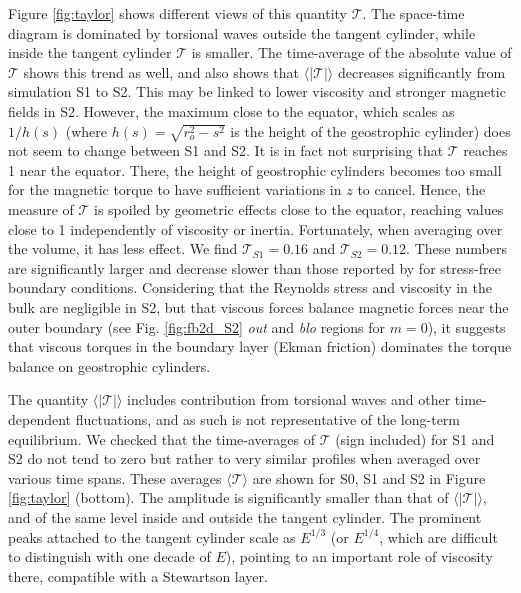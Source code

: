 \documentclass[12pt, a4paper]{article}
\begin{document}
Figure \ref{fig:taylor} shows different views of this quantity $\mathcal{T}$.
The space-time diagram is dominated by torsional waves outside the tangent cylinder, while inside the tangent cylinder $\mathcal{T}$ is smaller.
The time-average of the absolute value of $\mathcal{T}$ shows this trend as well, and also shows that $\langle|\mathcal{T}|\rangle$ decreases significantly from simulation S1 to S2.
This may be linked to lower viscosity and stronger magnetic fields in S2.
However, the maximum close to the equator, which scales as $1/h(s)$ (where $h(s) = \sqrt{r_o^2 - s^2}$ is the height of the geostrophic cylinder) does not seem to change between S1 and S2.
It is in fact not surprising that $\mathcal{T}$ reaches 1 near the equator.
There, the height of geostrophic cylinders becomes too small for the magnetic torque to have sufficient variations in $z$ to cancel.
Hence, the measure of $\mathcal{T}$ is spoiled by geometric effects close to the equator, reaching values close to 1 independently of viscosity or inertia.
Fortunately, when averaging over the volume, it has less effect.
We find $\mathcal{T}_{S1}=0.16$ and $\mathcal{T}_{S2}=0.12$.
These numbers are significantly larger and decrease slower than those reported by \cite{aubert2017} for stress-free boundary conditions.
Considering that the Reynolds stress and viscosity in the bulk are negligible in S2, but that viscous forces balance magnetic forces near the outer boundary (see Fig. \ref{fig:fb2d_S2} \textit{out} and \textit{blo} regions for $m=0$), it suggests that viscous torques in the boundary layer (Ekman friction) dominates the torque balance on geostrophic cylinders.

The quantity $\langle|\mathcal{T}|\rangle$ includes contribution from torsional waves and other time-dependent fluctuations, and as such is not representative of the long-term equilibrium.
We checked that the time-averages of $\mathcal{T}$ (sign included) for S1 and S2 do not tend to zero but rather to very similar profiles when averaged over various time spans.
These averages $\langle\mathcal{T}\rangle$ are shown for S0, S1 and S2 in Figure \ref{fig:taylor} (bottom).
The amplitude is significantly smaller than that of $\langle|\mathcal{T}|\rangle$, and of the same level inside and outside the tangent cylinder.
The prominent peaks attached to the tangent cylinder scale as $E^{1/3}$ (or $E^{1/4}$, which are difficult to distinguish with one decade of $E$), pointing to an important role of viscosity there, compatible with a Stewartson layer.
\end{document}
